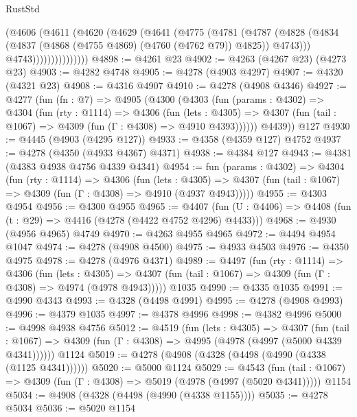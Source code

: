 \begin{lexlean}{RustStd}
\begin{coremodule}
{\begin{coremodule}
{{{{{{{{{{{{{{{{{{{{{{{{{{{{{{{{{{{                    (@4606
                      (@4611
                        (@4620
                          (@4629
                            (@4641
                              (@4775
                                (@4781
                                  (@4787
                                    (@4828
                                      (@4834
                                        (@4837 (@4868 (@4755 @4869) (@4760 (@4762 @79)) @4825))
                                        @4743)))
                                  @4743)))))))))))))))
@4898 := @4261 @23
@4902 := @4263 (@4267 @23) (@4273 @23)
@4903 := @4282 @4748
@4905 := @4278 (@4903 @4297)
@4907 := @4320 (@4321 @23)
@4908 := @4316 @4907
@4910 := @4278 (@4908 @4346)
@4927 := @4277
    (fun (fn : @7) =>
    @4905
      (@4300
        (@4303
          (fun (params : @4302) =>
          @4304
            (fun (rty : @1114) =>
            @4306
              (fun (lets : @4305) =>
              @4307 (fun (tail : @1067) => @4309 (fun (Γ : @4308) => @4910 @4393))))))
        @4439))
    @127
@4930 := @4445 (@4903 (@4295 @127))
@4933 := @4358 (@4359 @127) @4752
@4937 := @4278 (@4350 (@4933 @4367) @4371)
@4938 := @4384 @127
@4943 := @4381 (@4383 @4938 @4756 @4339 @4341)
@4954 := fun (params : @4302) =>
  @4304
    (fun (rty : @1114) =>
    @4306
      (fun (lets : @4305) =>
      @4307 (fun (tail : @1067) => @4309 (fun (Γ : @4308) => @4910 (@4937 @4943)))))
@4955 := @4303 @4954
@4956 := @4300 @4955
@4965 := @4407 (fun (U : @4406) => @4408 (fun (t : @29) => @4416 (@4278 (@4422 @4752 @4296) @4433)))
@4968 := @4930 (@4956 @4965) @4749
@4970 := @4263 @4955 @4965
@4972 := @4494 @4954 @1047
@4974 := @4278 (@4908 @4500)
@4975 := @4933 @4503
@4976 := @4350 @4975
@4978 := @4278 (@4976 @4371)
@4989 := @4497
    (fun (rty : @1114) =>
    @4306
      (fun (lets : @4305) =>
      @4307 (fun (tail : @1067) => @4309 (fun (Γ : @4308) => @4974 (@4978 @4943)))))
    @1035
@4990 := @4335 @1035
@4991 := @4990 @4343
@4993 := @4328 (@4498 @4991)
@4995 := @4278 (@4908 @4993)
@4996 := @4379 @1035
@4997 := @4378 @4996
@4998 := @4382 @4996
@5000 := @4998 @4938 @4756
@5012 := @4519
    (fun (lets : @4305) =>
    @4307
      (fun (tail : @1067) => @4309 (fun (Γ : @4308) => @4995 (@4978 (@4997 (@5000 @4339 @4341))))))
    @1124
@5019 := @4278 (@4908 (@4328 (@4498 (@4990 (@4338 (@1125 @4341))))))
@5020 := @5000 @1124
@5029 := @4543
    (fun (tail : @1067) => @4309 (fun (Γ : @4308) => @5019 (@4978 (@4997 (@5020 @4341)))))
    @1154
@5034 := @4908 (@4328 (@4498 (@4990 (@4338 @1155))))
@5035 := @4278 @5034
@5036 := @5020 @1154
}}}}}}}}}}}}}}}}}}}}}}}}}}}}}}}}}}}
\end{coremodule}}
\end{coremodule}
\end{lexlean}
